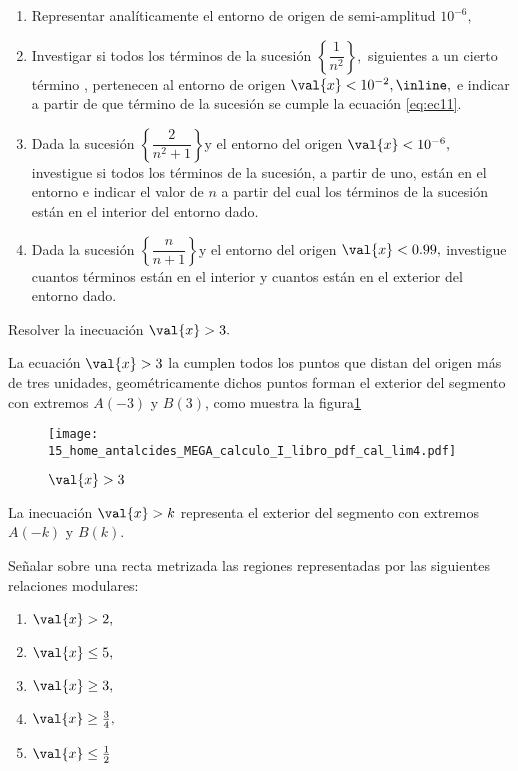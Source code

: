 \begin{ejercicios}[]
\begin{enumerate}
\item Representar analíticamente el entorno de origen de semi-amplitud $10^{-6},$
\item Investigar si todos los términos de la sucesión $\left\{ \dfrac{1}{n^{2}}\right\} ,$
siguientes a un cierto término , pertenecen al entorno de origen $\val{x}<10^{-2},\inline\text{\label{eq:ec11}},$
e indicar a partir de que término de la sucesión se cumple la ecuación
\ref{eq:ec11}. 
\item Dada la sucesión $\left\{ \dfrac{2}{n^{2}+1}\right\} $y el entorno
del origen $\val{x}<10^{-6},$ investigue si todos los términos de
la sucesión, a partir de uno, están en el entorno e indicar el valor
de $n$ a partir del cual los términos de la sucesión están en el
interior del entorno dado. 
\item Dada la sucesión $\left\{ \dfrac{n}{n+1}\right\} $y el entorno del
origen $\val{x}<0.99,$ investigue cuantos términos están en el interior
y cuantos están en el exterior del entorno dado.
\end{enumerate}
\end{ejercicios}

\begin{ejemplo}

Resolver la inecuación $\val{x}>3.$ 

\end{ejemplo}

\sol La ecuación $\val{x}>3$ la cumplen todos los puntos que distan
del origen más de tres unidades, geométricamente dichos puntos forman
el exterior del segmento con extremos $A\left(-3\right)$ y $B\left(3\right)$,
como muestra la figura\ref{fig:cal_lim4} 
\begin{figure}[H]
\centering\texttt{[image: 15\_home\_antalcides\_MEGA\_calculo\_I\_libro\_pdf\_cal\_lim4.pdf]}\caption{$\val{x}> 3$}\label{fig:cal_lim4}
\end{figure}
\fin

\general La inecuación $\val{x}>k$ representa el exterior del segmento
con extremos $A\left(-k\right)$ y $B\left(k\right).$ 

\begin{ejercicios}[] Señalar sobre una recta metrizada las regiones
representadas por las siguientes relaciones modulares:
\begin{enumerate}
\item $\val{x}>2,$
\item $\val{x}\leq5,$
\item $\val{x}\geq3,$
\item $\val{x}\geq\frac{3}{4},$
\item $\val{x}\leq\frac{1}{2}$
\end{enumerate}
\end{ejercicios}

